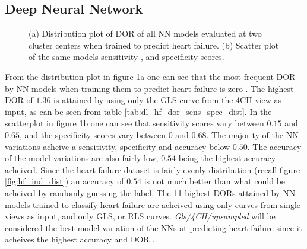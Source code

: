 \clearpage

\subsection{Deep Neural Network}

\begin{figure}[H]
    \centering
    
    \caption{(a) Distribution plot of DOR of all NN models evaluated at two cluster centers when trained to predict heart failure.
             (b) Scatter plot of the same models sensitivity-, and specificity-scores.}
    \label{fig:dl_hf_dor_sens_spec_dist}
\end{figure}

From the distribution plot in figure \ref{fig:dl_hf_dor_sens_spec_dist}a one can see that the most frequent DOR by NN models when training them to predict heart failure is zero .
The highest DOR of $1.36$ is attained by using only the GLS curve from the 4CH view as input, as can be seen from table \ref{tab:dl_hf_dor_sens_spec_dist}.
In the scatterplot in figure \ref{fig:dl_hf_dor_sens_spec_dist}b one can see that sensitivity scores vary between $0.15$ and $0.65$, and the specificity scores vary between $0$ and $0.68$.
The majority of the NN variations acheive a sensitivity, specificity and accuracy below $0.50$.
The accuracy of the model variations are also fairly low, $0.54$ being the highest accuracy acheived.
Since the heart failure dataset is fairly evenly distribution (recall figure \ref{fig:hf_ind_dist}) an accuracy of $0.54$ is not much better than what could be acheived 
by randomly guessing the label. 
The 11 highest DORs attained by NN models trained to classify heart failure are acheived using only curves from single views as input, and only GLS, or RLS curves.
\textit{Gls/4CH/upsampled} will be considered the best model variation of the NNs at predicting heart failure since it acheives the highest accuracy and DOR . \bigskip


